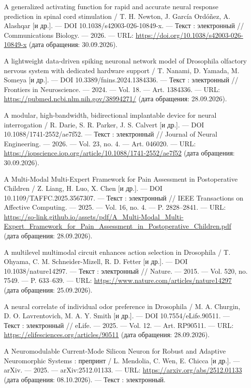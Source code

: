 \begin{list}{}{\setlength{\leftmargin}{10mm}\setlength{\labelwidth}{8mm}\setlength{\labelsep}{2mm}\setlength{\itemsep}{0pt}\setlength{\parsep}{0pt}\setlength{\topsep}{0pt}}
\item[7.] A generalized activating function for rapid and accurate neural response prediction in spinal cord stimulation / T. H. Newton, J. García Ordóñez, A. Alashqar [и др.]. — DOI 10.1038/s42003-026-10849-x. — Текст : электронный // Communications Biology. — 2026. — URL: \url{https://doi.org/10.1038/s42003-026-10849-x} (дата обращения: 30.09.2026).
\item[8.] A lightweight data-driven spiking neuronal network model of Drosophila olfactory nervous system with dedicated hardware support / T. Nanami, D. Yamada, M. Someya [и др.]. — DOI 10.3389/fnins.2024.1384336. — Текст : электронный // Frontiers in Neuroscience. — 2024. — Vol. 18. — Art. 1384336. — URL: \url{https://pubmed.ncbi.nlm.nih.gov/38994271/} (дата обращения: 28.09.2026).
\item[9.] A modular, high-bandwidth, bidirectional implantable device for neural interrogation / R. Darie, S. R. Parker, J. S. Calvert [и др.]. — DOI 10.1088/1741-2552/ae7f52. — Текст : электронный // Journal of Neural Engineering. — 2026. — Vol. 23, no. 4. — Art. 046020. — URL: \url{https://iopscience.iop.org/article/10.1088/1741-2552/ae7f52} (дата обращения: 30.09.2026).
\item[10.] A Multi-Modal Multi-Expert Framework for Pain Assessment in Postoperative Children / Z. Liang, H. Luo, X. Chen [и др.]. — DOI 10.1109/TAFFC.2025.3567307. — Текст : электронный // IEEE Transactions on Affective Computing. — 2025. — Vol. 16, no. 4. — P. 2828–2841. — URL: \url{https://so-link.github.io/assets/pdf/A\_Multi-Modal\_Multi-Expert\_Framework\_for\_Pain\_Assessment\_in\_Postoperative\_Children.pdf} (дата обращения: 28.09.2026).
\item[11.] A multilevel multimodal circuit enhances action selection in Drosophila / T. Ohyama, C. M. Schneider-Mizell, R. D. Fetter [и др.]. — DOI 10.1038/nature14297. — Текст : электронный // Nature. — 2015. — Vol. 520, no. 7549. — P. 633–639. — URL: \url{https://www.nature.com/articles/nature14297} (дата обращения: 25.09.2026).
\item[12.] A neural correlate of individual odor preference in Drosophila / M. A. Churgin, D. O. Lavrentovich, M. A. Y. Smith [и др.]. — DOI 10.7554/eLife.90511. — Текст : электронный // eLife. — 2025. — Vol. 12. — Art. RP90511. — URL: \url{https://elifesciences.org/articles/90511} (дата обращения: 28.09.2026).
\item[13.] A Neuromodulable Current-Mode Silicon Neuron for Robust and Adaptive Neuromorphic Systems : препринт / L. Mendolia, C. Wen, E. Chicca [и др.]. — arXiv. — 2025. — arXiv:2512.01133. — URL: \url{https://arxiv.org/abs/2512.01133} (дата обращения: 08.10.2026). — Текст : электронный.

\end{list}
